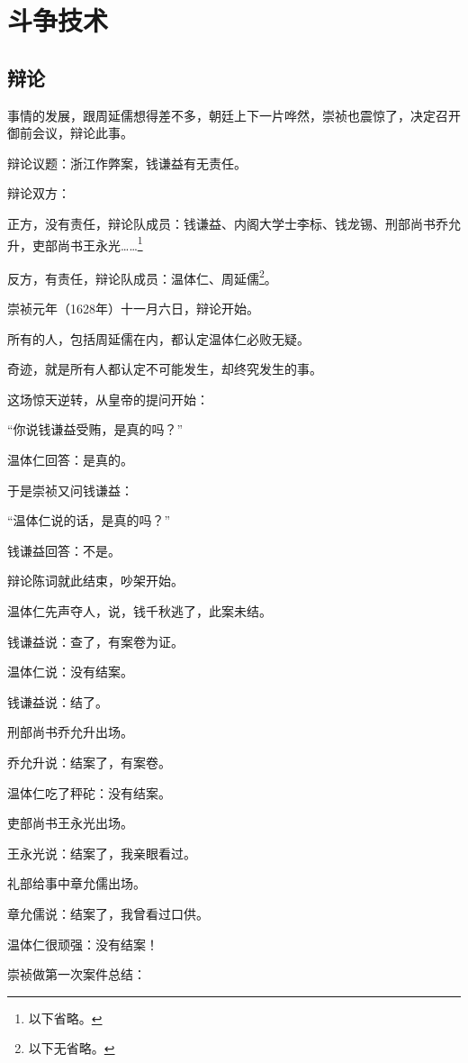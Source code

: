 \section{斗争技术}
\ifnum{}
	\begin{multicols}{\theparacolNo}
		\fi
		\subsection{辩论}
		事情的发展，跟周延儒想得差不多，朝廷上下一片哗然，崇祯也震惊了，决定召开御前会议，辩论此事。

		辩论议题：浙江作弊案，钱谦益有无责任。

		辩论双方：

		正方，没有责任，辩论队成员：钱谦益、内阁大学士李标、钱龙锡、刑部尚书乔允升，吏部尚书王永光……\footnote{以下省略。}

		反方，有责任，辩论队成员：温体仁、周延儒\footnote{以下无省略。}。

		崇祯元年（1628年）十一月六日，辩论开始。

		所有的人，包括周延儒在内，都认定温体仁必败无疑。

		奇迹，就是所有人都认定不可能发生，却终究发生的事。

		这场惊天逆转，从皇帝的提问开始：

		“你说钱谦益受贿，是真的吗？”

		温体仁回答：是真的。

		于是崇祯又问钱谦益：

		“温体仁说的话，是真的吗？”

		钱谦益回答：不是。

		辩论陈词就此结束，吵架开始。

		温体仁先声夺人，说，钱千秋逃了，此案未结。

		钱谦益说：查了，有案卷为证。

		温体仁说：没有结案。

		钱谦益说：结了。

		刑部尚书乔允升出场。

		乔允升说：结案了，有案卷。

		温体仁吃了秤砣：没有结案。

		吏部尚书王永光出场。

		王永光说：结案了，我亲眼看过。

		礼部给事中章允儒出场。

		章允儒说：结案了，我曾看过口供。

		温体仁很顽强：没有结案！

		崇祯做第一次案件总结：


\end{multicols}
